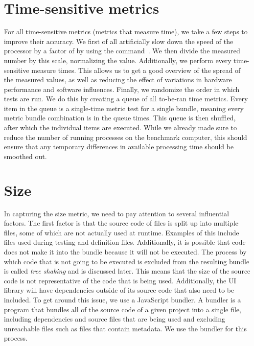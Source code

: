 \section{Time-sensitive metrics}\label{sec:experimental-setup:time-sensitive-metrics}
For all time-sensitive metrics (metrics that measure time), we take a few steps to improve their accuracy. We first of all artificially slow down the speed of the processor by a factor of \slowdownFactor{} by using the  command~. We then divide the measured number by this scale, normalizing the value. Additionally, we perform every time-sensitive measure \numMeasures{} times. This allows us to get a good overview of the spread of the measured values, as well as reducing the effect of variations in hardware performance and software influences. Finally, we randomize the order in which tests are run. We do this by creating a queue of all to-be-ran time metrics. Every item in the queue is a single-time metric test for a single bundle, meaning every metric bundle combination is in the queue \numMeasures{} times. This queue is then shuffled, after which the individual items are executed. While we already made sure to reduce the number of running processes on the benchmark computer, this should ensure that any temporary differences in available processing time should be smoothed out.


\section{Size}\label{sec:experimental-setup:size}
In capturing the size metric, we need to pay attention to several influential factors. The first factor is that the source code of files is split up into multiple files, some of which are not actually used at runtime. Examples of this include files used during testing and definition files. Additionally, it is possible that code does not make it into the bundle because it will not be executed. The process by which code that is not going to be executed is excluded from the resulting bundle is called \emph{tree shaking} and is discussed later. This means that the size of the source code is not representative of the code that is being used. Additionally, the UI library will have dependencies outside of its source code that also need to be included. To get around this issue, we use a JavaScript bundler. A bundler is a program that bundles all of the source code of a given project into a single file, including dependencies and source files that are being used and excluding unreachable files such as files that contain metadata. We use the  bundler for this process.


